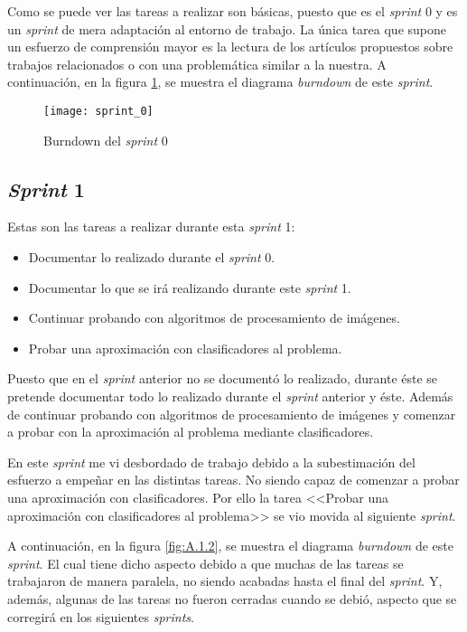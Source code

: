 Como se puede ver las tareas a realizar son básicas, puesto que es el \textit{sprint} 0 y es un \textit{sprint} de mera adaptación al entorno de trabajo. La única tarea que supone un esfuerzo de comprensión mayor es la lectura de los artículos propuestos sobre trabajos relacionados o con una problemática similar a la nuestra. A continuación, en la figura \ref{fig:A.1.1}, se muestra el diagrama \textit{burndown} de este \textit{sprint}. 

\begin{figure}
\centering
\texttt{[image: sprint\_0]}
\caption{Burndown del \textit{sprint} 0}
\label{fig:A.1.1}
\end{figure}

\subsection{\textit{Sprint} 1}
Estas son las tareas a realizar durante esta \textit{sprint} 1:

\begin{itemize}
	\item Documentar lo realizado durante el \textit{sprint} 0.
	\item Documentar lo que se irá realizando durante este \textit{sprint} 1.
	\item Continuar probando con algoritmos de procesamiento de imágenes.
	\item Probar una aproximación con clasificadores al problema.
\end{itemize}

Puesto que en el \textit{sprint} anterior no se documentó lo realizado, durante éste se pretende documentar todo lo realizado durante el \textit{sprint} anterior y éste. Además de continuar probando con algoritmos de procesamiento de imágenes y comenzar a probar con la aproximación al problema mediante clasificadores.

En este \textit{sprint} me vi desbordado de trabajo debido a la subestimación del esfuerzo a empeñar en las distintas tareas. No siendo capaz de comenzar a probar una aproximación con clasificadores. Por ello la tarea <<Probar una aproximación con clasificadores al problema>> se vio movida al siguiente \textit{sprint}. 

A continuación, en la figura \ref{fig:A.1.2}, se muestra el diagrama \textit{burndown} de este \textit{sprint}. El cual tiene dicho aspecto debido a que muchas de las tareas se trabajaron de manera paralela, no siendo acabadas hasta el final del \textit{sprint}. Y, además, algunas de las tareas no fueron cerradas cuando se debió, aspecto que se corregirá en los siguientes \textit{sprints}.

